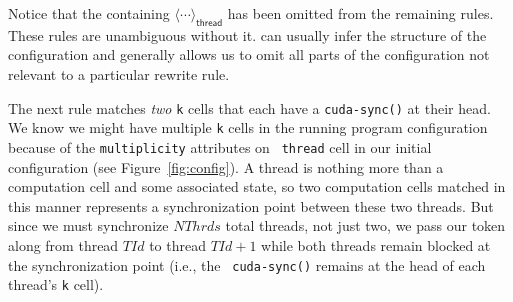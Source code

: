 \vspace{0.5em}
{\footnotesize







}

Notice that the containing $\langle \cdots \rangle_{\mathsf{thread}}$ has been
omitted from the remaining rules. These rules are unambiguous without it. \K can
usually infer the structure of the configuration and generally allows us to omit
all parts of the configuration not relevant to a particular rewrite rule.

The next rule matches {\em two} {\tt k} cells that each have a {\tt cuda-sync()}
at their head. We know we might have multiple {\tt k} cells in the running
program configuration because of the {\tt multiplicity} attributes on {\tt
thread} cell in our initial configuration (see Figure~\ref{fig:config}). A
thread is nothing more than a computation cell and some associated state, so two
computation cells matched in this manner represents a synchronization point
between these two threads. But since we must synchronize $NThrds$ total threads,
not just two, we pass our token along from thread $TId$ to thread $TId + 1$
while both threads remain blocked at the synchronization point (i.e., the {\tt
cuda-sync()} remains at the head of each thread's {\tt k} cell).

